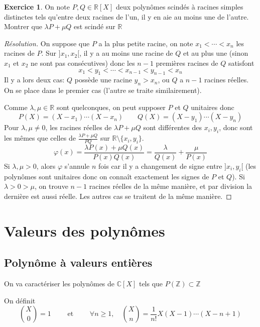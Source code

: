 \documentclass{article}
\theoremstyle{definition}
\newtheorem*{exo}{Exercice}
\begin{document}
\begin{exo}
    On note $P, Q\in\mathbb R[X]$ deux polynômes scindés à racines simples distinctes tels qu'entre deux racines de l'un, il y en aie au moins une de l'autre. Montrer que $\lambda P+\mu Q$ est scindé sur $\mathbb R$
\end{exo}

\begin{proof}[Résolution]
    On suppose que $P$ a la plus petite racine, on note $x_1 <\cdots<x_n$ les racines de $P$. Sur $]x_1, x_2[$, il y a au moins une racine de $Q$ et au plus une (sinon $x_1$ et $x_2$ ne sont pas consécutives) donc les $n-1$ premières racines de $Q$ satisfont \[
        x_1<y_1<\cdots <x_{n-1}<y_{n-1}<x_n
    \]
    Il y a lors deux cas: $Q$ possède une racine $y_n>x_n$, ou $Q$ a $n-1$ racines réelles. On se place dans le premier cas (l'autre se traite similairement).

    Comme $\lambda, \mu\in\mathbb R$ sont quelconques, on peut supposer $P$ et $Q$ unitaires donc \[
        P(X)=(X-x_1)\cdots (X-x_n) \qquad Q(X)=(X-y_1)\cdots (X-y_n)
    \]
    Pour $\lambda, \mu\neq 0$, les racines réelles de $\lambda P+\mu Q$ sont différentes des $x_i, y_i$, donc sont les mêmes que celles de $\frac{\lambda P+\mu Q}{PQ}$ sur $\mathbb R\setminus \{x_i, y_i\}$. \[
        \varphi(x)=\frac{\lambda P(x)+\mu Q(x)}{P(x)Q(x)}=\frac\lambda{Q(x)}+\frac\mu{P(x)}
    \]
    Si $\lambda, \mu>0$, alors $\varphi$ s'annule $n$ fois car il y a changement de signe entre $]x_i, y_i[$ (les polynômes sont unitaires donc on connaît exactement les signes de $P$ et $Q$). Si $\lambda>0>\mu$, on trouve $n-1$ racines réelles de la même manière, et par division la dernière est aussi réelle. Les autres cas se traitent de la même manière.
\end{proof}

\section{Valeurs des polynômes}

\subsection{Polynôme à valeurs entières}

On va caractériser les polynômes de $\mathbb C[X]$ tels que $P(\mathbb Z)\subset \mathbb Z$

On définit \[
    \binom X0=1\qquad \text{ et }\qquad \forall n\geq 1,\quad \binom Xn=\frac1{n!}X(X-1)\cdots(X-n+1)
\]
\end{document}
